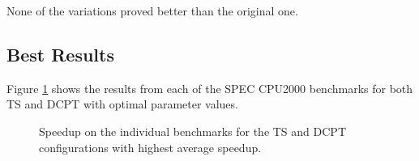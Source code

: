 None of the variations proved better than the original one.

\subsection{Best Results}

Figure \ref{figure:benchmarks-plot} shows the results from each of the SPEC
CPU2000 benchmarks for both TS and DCPT with optimal parameter values.

\begin{figure}[h!]
	\begin{centering}
		
		\caption{Speedup on the individual benchmarks for the TS and DCPT configurations with highest average speedup.}
		\label{figure:benchmarks-plot}
	\end{centering}
\end{figure}
